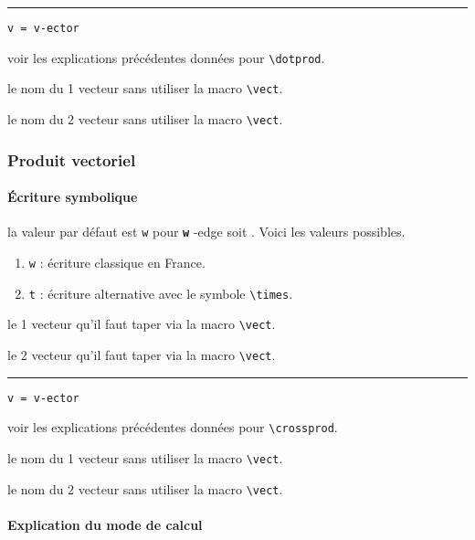 \documentclass[12pt,a4paper]{article}
\makeatletter
\newcommand\env[1]{\texttt{#1}}
\newcommand\macro[1]{\env{\textbackslash{}#1}}
\theoremstyle{definition}
\newcommand\separation{
	\medskip
	\hfill\rule{0.5\textwidth}{0.75pt}\hfill
	\medskip
}
\newcommand\whyprefix[2]{%
	\textbf{\prefix{#1}}-#2%
}
\newcommand\mwhyprefix[2]{%
	\texttt{#1 = #1-#2}%
}
\newcommand\prefix[1]{%
	\texttt{#1}%
}
\newcommand\inenglish{\@ifstar{\@inenglish@star}{\@inenglish@no@star}}
\newcommand\@inenglish@star[1]{%
	\emph{\og #1 \fg}%
}
\newcommand\@inenglish@no@star[1]{%
	\@inenglish@star{#1} en anglais%
}
\makeatother
\begin{document}
\separation


 \hfill \mwhyprefix{v}{ector}

\IDoption{} voir les explications précédentes données pour \macro{dotprod}.

 le nom du 1\ier{} vecteur sans utiliser la macro \macro{vect}.

 le nom du 2\ieme{} vecteur sans utiliser la macro \macro{vect}.


\subsubsection{Produit vectoriel}

\paragraph{Écriture symbolique}




\IDoption{} la valeur par défaut est \verb+w+ pour \whyprefix{w}{edge} soit \inenglish{coin}. Voici les valeurs possibles.

\begin{enumerate}
	\item \verb+w+ : écriture classique en France.

	\item \verb+t+ : écriture alternative avec le symbole \macro{times}.

\end{enumerate}

 le 1\ier{} vecteur qu'il faut taper via la macro \macro{vect}.

 le 2\ieme{} vecteur qu'il faut taper via la macro \macro{vect}.


\separation


 \hfill \mwhyprefix{v}{ector}

\IDoption{} voir les explications précédentes données pour \macro{crossprod}.

 le nom du 1\ier{} vecteur sans utiliser la macro \macro{vect}.

 le nom du 2\ieme{} vecteur sans utiliser la macro \macro{vect}.




\paragraph{Explication du mode de calcul}
\end{document}
